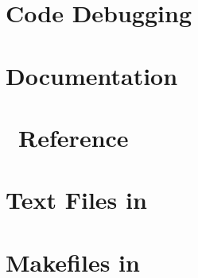 \documentclass[12pt]{article}
\begin{document}
\section{Code Debugging}\label{Debugging}


\section{Documentation}\label{Documentation}


\newpage
\appendix

\section{\PSIthree\ Reference}\label{PSI_Reference}


\section{Text Files in \PSIthree}\label{Text_files}


\section{Makefiles in \PSIthree}\label{Makefiles}


%


%


%
\end{document}
